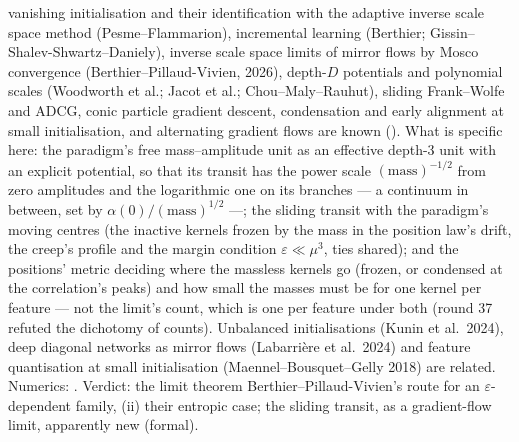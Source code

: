 \begin{itemize}
    vanishing initialisation and their identification with the adaptive inverse scale space method (Pesme--Flammarion),
    incremental learning (Berthier; Gissin--Shalev-Shwartz--Daniely), inverse scale space limits of mirror flows by Mosco
    convergence (Berthier--Pillaud-Vivien, 2026), depth-$D$ potentials and polynomial scales (Woodworth et al.; Jacot et
    al.; Chou--Maly--Rauhut), sliding Frank--Wolfe and ADCG, conic particle gradient descent, condensation and early
    alignment at small initialisation, and alternating gradient flows are known (\cite{S75}). What is specific here: the
    paradigm's free mass--amplitude unit as an effective depth-3 unit with an explicit potential, so that its transit has
    the power scale $(\text{mass})^{-1/2}$ from zero amplitudes and the logarithmic one on its branches --- a continuum in
    between, set by $\alpha(0)/(\text{mass})^{1/2}$ ---; the sliding transit with the paradigm's moving centres (the
    inactive kernels frozen by the mass in the position law's drift, the creep's profile and the margin condition
    $\varepsilon\ll\mu^3$, ties shared); and the positions' metric deciding where the massless kernels go (frozen, or
    condensed at the correlation's peaks) and how small the masses must be for one kernel per feature --- not the limit's
    count, which is one per feature under both (round 37 refuted the dichotomy of counts). Unbalanced initialisations
    (Kunin et al.\ 2024), deep diagonal networks as mirror flows (Labarri\`ere et al.\ 2024) and feature quantisation at
    small initialisation (Maennel--Bousquet--Gelly 2018) are related. Numerics: . Verdict:
    the limit theorem Berthier--Pillaud-Vivien's route for an $\varepsilon$-dependent family, (ii) their entropic case;
    the sliding transit, as a gradient-flow limit, apparently new (formal).
\end{itemize}

